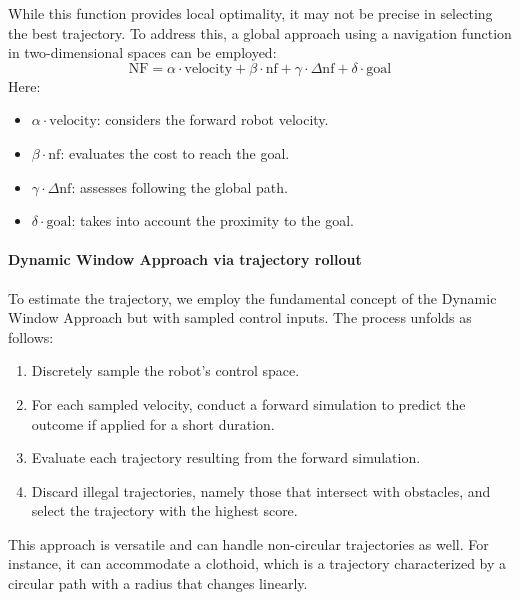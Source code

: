 While this function provides local optimality, it may not be precise in selecting the best trajectory. 
To address this, a global approach using a navigation function in two-dimensional spaces can be employed:
\[\text{NF}=\alpha\cdot\text{velocity}+\beta\cdot\text{nf}+\gamma\cdot\Delta\text{nf}+\delta\cdot\text{goal}\]
Here:
\begin{itemize}
    \item $\alpha\cdot\text{velocity}$: considers the forward robot velocity.
    \item $\beta\cdot\text{nf}$: evaluates the cost to reach the goal.
    \item $\gamma\cdot\Delta\text{nf}$: assesses following the global path.
    \item $\delta\cdot\text{goal}$: takes into account the proximity to the goal.
\end{itemize}

\paragraph*{Dynamic Window Approach via trajectory rollout}
To estimate the trajectory, we employ the fundamental concept of the Dynamic Window Approach but with sampled control inputs. 
The process unfolds as follows:
\begin{enumerate}
    \item Discretely sample the robot's control space.
    \item For each sampled velocity, conduct a forward simulation to predict the outcome if applied for a short duration.
    \item Evaluate each trajectory resulting from the forward simulation.
    \item Discard illegal trajectories, namely those that intersect with obstacles, and select the trajectory with the highest score.
\end{enumerate}
This approach is versatile and can handle non-circular trajectories as well.
For instance, it can accommodate a clothoid, which is a trajectory characterized by a circular path with a radius that changes linearly.